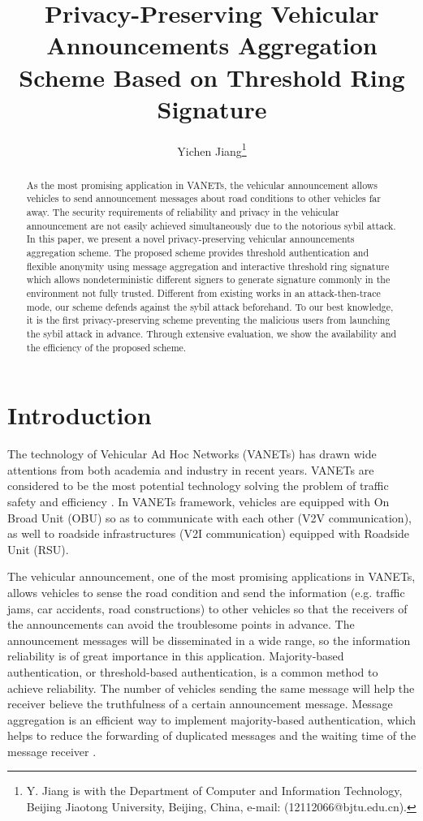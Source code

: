 \documentclass[a4paper]{article}
\title{Privacy-Preserving Vehicular Announcements Aggregation Scheme Based on Threshold Ring Signature}
\author{Yichen Jiang\thanks{Y. Jiang is with the Department of Computer and Information Technology, Beijing Jiaotong University, Beijing, China, e-mail: (12112066@bjtu.edu.cn).}}
\begin{document}
\maketitle

\begin{abstract}
As the most promising application in VANETs, the vehicular announcement allows vehicles to send announcement messages about road conditions to other vehicles far away. The security requirements of reliability and privacy in the vehicular announcement are not easily achieved simultaneously due to the notorious sybil attack. In this paper, we present a novel privacy-preserving vehicular announcements aggregation scheme. The proposed scheme provides threshold authentication and flexible anonymity using message aggregation and interactive threshold ring signature which allows nondeterministic different signers to generate signature commonly in the environment not fully trusted. Different from existing works in an attack-then-trace mode, our scheme defends against the sybil attack beforehand. To our best knowledge, it is the first privacy-preserving scheme preventing the malicious users from launching the sybil attack in advance. Through extensive evaluation, we show the availability and the efficiency of the proposed scheme.
\end{abstract}


\section{Introduction}
The technology of Vehicular Ad Hoc Networks (VANETs) has drawn wide attentions from both academia and industry in recent years. VANETs are considered to be the most potential technology solving the problem of traffic safety and efficiency \cite{HL08}. In VANETs framework, vehicles are equipped with On Broad Unit (OBU) so as to communicate with each other (V2V communication), as well to roadside infrastructures (V2I communication) equipped with Roadside Unit (RSU).

The vehicular announcement, one of the most promising applications in VANETs, allows vehicles to sense the road condition and send the information (e.g. traffic jams, car accidents, road constructions) to other vehicles so that the receivers of the announcements can avoid the troublesome points in advance. The announcement messages will be disseminated in a wide range, so the information reliability is of great importance in this application. Majority-based authentication, or threshold-based authentication, is a common method to achieve reliability. The number of vehicles sending the same message will help the receiver believe the truthfulness of a certain announcement message. Message aggregation is an efficient way to implement majority-based authentication, which helps to reduce the forwarding of duplicated messages and the waiting time of the message receiver \cite{RAH06}.
\end{document}
